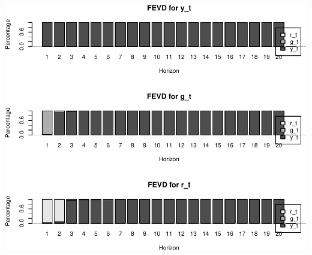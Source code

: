 \documentclass[11pt,preprint, authoryear]{elsarticle}
\numberwithin{equation}{section}
\numberwithin{figure}{section}
\numberwithin{table}{section}
\begin{document}
\includegraphics{TS_proj_files/figure-latex/unnamed-chunk-29-1.pdf}


\end{document}
